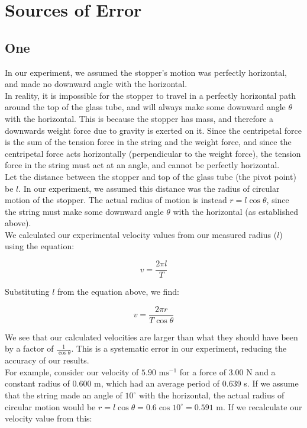 \documentclass[a4paper,11pt]{article}
\begin{document}
\section{Sources of Error}

\subsection{One}

In our experiment, we assumed the stopper's motion was perfectly horizontal, and
made no downward angle with the horizontal. \\

In reality, it is impossible for the stopper to travel in a perfectly horizontal path around
the top of the glass tube, and will always make some downward angle $\theta$
with the horizontal. This is because the stopper has mass, and therefore a
downwards weight force due to gravity is exerted on it. Since the centripetal
force is the sum of the tension force in the string and the weight force, and
since the centripetal force acts horizontally (perpendicular to the
weight force), the tension force in the string must act at an angle, and cannot
be perfectly horizontal. \\

Let the distance between the stopper and top of the glass tube (the pivot point)
be $l$. In our experiment, we assumed this distance was the radius of circular
motion of the stopper. The actual radius of motion is instead
$r = l \cos{\theta}$, since the string must make some downward angle $\theta$
with the horizontal (as established above). \\

We calculated our experimental velocity values from our measured radius ($l$)
using the equation:

$$
v = \frac{2 \pi l}{T}
$$

Substituting $l$ from the equation above, we find:

$$
v = \frac{2 \pi r}{T \cos{\theta}}
$$

We see that our calculated velocities are larger than what they should have
been by a factor of $\frac{1}{\cos{\theta}}$. This is a systematic error in our
experiment, reducing the accuracy of our results. \\

For example, consider our velocity of $5.90\mbox{ ms}^{-1}$ for a force of
3.00 N and a constant radius of 0.600 m, which had an average period of 0.639 s.
If we assume that the string made an angle of $10^\circ$ with the horizontal,
the actual radius of circular motion would be
$r = l \cos{\theta} = 0.6 \cos{10^\circ} = 0.591\mbox{ m}$. If we recalculate
our velocity value from this:
\end{document}
